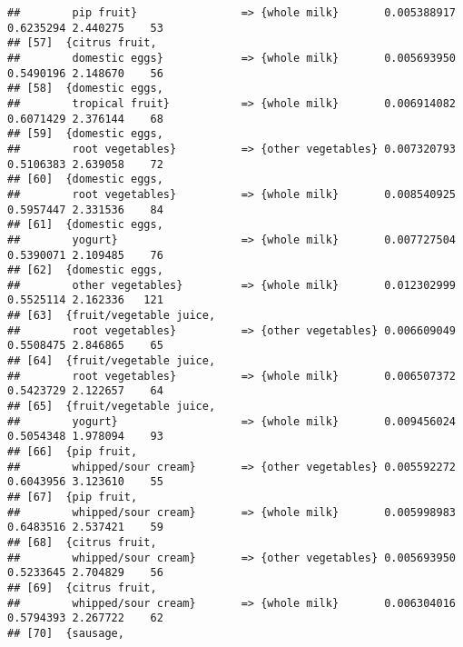 \documentclass[]{article}
\begin{document}
\begin{verbatim}
##        pip fruit}                => {whole milk}       0.005388917  0.6235294 2.440275    53
## [57]  {citrus fruit,                                                                        
##        domestic eggs}            => {whole milk}       0.005693950  0.5490196 2.148670    56
## [58]  {domestic eggs,                                                                       
##        tropical fruit}           => {whole milk}       0.006914082  0.6071429 2.376144    68
## [59]  {domestic eggs,                                                                       
##        root vegetables}          => {other vegetables} 0.007320793  0.5106383 2.639058    72
## [60]  {domestic eggs,                                                                       
##        root vegetables}          => {whole milk}       0.008540925  0.5957447 2.331536    84
## [61]  {domestic eggs,                                                                       
##        yogurt}                   => {whole milk}       0.007727504  0.5390071 2.109485    76
## [62]  {domestic eggs,                                                                       
##        other vegetables}         => {whole milk}       0.012302999  0.5525114 2.162336   121
## [63]  {fruit/vegetable juice,                                                               
##        root vegetables}          => {other vegetables} 0.006609049  0.5508475 2.846865    65
## [64]  {fruit/vegetable juice,                                                               
##        root vegetables}          => {whole milk}       0.006507372  0.5423729 2.122657    64
## [65]  {fruit/vegetable juice,                                                               
##        yogurt}                   => {whole milk}       0.009456024  0.5054348 1.978094    93
## [66]  {pip fruit,                                                                           
##        whipped/sour cream}       => {other vegetables} 0.005592272  0.6043956 3.123610    55
## [67]  {pip fruit,                                                                           
##        whipped/sour cream}       => {whole milk}       0.005998983  0.6483516 2.537421    59
## [68]  {citrus fruit,                                                                        
##        whipped/sour cream}       => {other vegetables} 0.005693950  0.5233645 2.704829    56
## [69]  {citrus fruit,                                                                        
##        whipped/sour cream}       => {whole milk}       0.006304016  0.5794393 2.267722    62
## [70]  {sausage,                                                                             

\end{verbatim}
\end{document}
